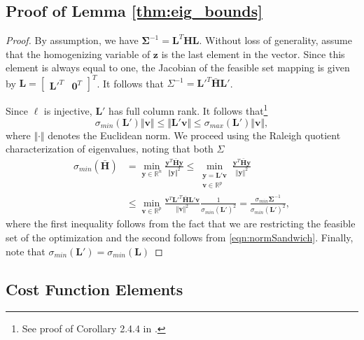 \documentclass[lettersize,journal]{IEEEtran}
\begin{document}
{\subsection{Proof of Lemma \ref{thm:eig_bounds}}\label{SM:lemma2Proof}

\begin{proof}
By assumption, we have $\bm{\Sigma}^{-1} = \bm{L}^T\bm{H}\bm{L}$. Without loss of generality, assume that the homogenizing variable of $\bm{z}$ is the last element in the vector. Since this element is always equal to one, the Jacobian of the feasible set mapping is given by $\bm{L} = \begin{bmatrix}
	\bm{L}'^T & \bm{0}^T
\end{bmatrix}^T$. It follows that ${\Sigma}^{-1} = \bm{L}'^T\bar{\bm{H}}\bm{L}'$.

Since $\bm{\ell}$ is injective, $\bm{L}'$ has full column rank. It follows that\footnote{See proof of Corollary 2.4.4 in \cite{golubMatrixComputations2013}.}
\begin{equation}\label{eqn:normSandwich}
	\sigma_{min}(\bm{L}') \Vert\bm{v}\Vert \leq  \Vert\bm{L}'\bm{v}\Vert \leq \sigma_{max}(\bm{L}')\Vert\bm{v}\Vert,
\end{equation}
where $\Vert\cdot\Vert$ denotes the Euclidean norm. We proceed using the Raleigh quotient characterization of eigenvalues, noting that both $\Sigma$
\begin{align*}
	\sigma_{min}(\bar{\bm{H}}) &= \min\limits_{\bm{y}\in\mathbb{R}^n} \frac{\bm{y}^T \bar{\bm{H}} \bm{y}}{\Vert\bm{y}\Vert^2} 
	\leq \min\limits_{\substack{\bm{y}=\bm{L}'\bm{v}\\\bm{v}\in\mathbb{R}^p}} \frac{\bm{y}^T \bar{\bm{H}} \bm{y}}{\Vert\bm{y}\Vert^2} \\ 
	&\leq \min\limits_{\bm{v}\in\mathbb{R}^p} \frac{\bm{v}^T \bm{L}'^T\bar{\bm{H}}\bm{L}' \bm{v}}{\Vert\bm{v}\Vert^2 } \frac{1}{\sigma_{min}(\bm{L}')^2} 
	= \frac{\sigma_{min}{\bm{\Sigma}^{-1}}}{\sigma_{min}(\bm{L}')^2},
\end{align*}
where the first inequality follows from the fact that we are restricting the feasible set of the optimization and the second follows from \eqref{eqn:normSandwich}. Finally, note that $\sigma_{min}(\bm{L}') = \sigma_{min}(\bm{L})$

\end{proof}

\subsection{Cost Function Elements}\label{SM:LocCost}

}
\end{document}
